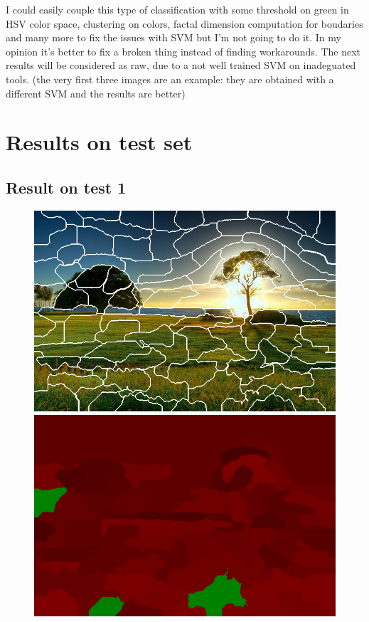 \documentclass[a4paper,titlepaget]{article}
\begin{document}
I could easily couple this type of classification with some threshold on green in HSV color space, clustering on colors, factal dimension computation for boudaries and many more to fix the issues with SVM but I'm not going to do it. In my opinion it's better to fix a broken thing instead of finding workarounds. The next results will be considered as raw, due to a not well trained SVM on inadeguated tools. (the very first three images are an example: they are obtained with a different SVM and the results are better)

\newpage
\section{Results on test set}
\subsection{Result on test 1}
\begin{figure}[htpb] 
	\centering
	\begin{minipage}{.3\textwidth}
		\includegraphics[width=1.7\textwidth]{images/results/1seg} 
	\end{minipage}
	\hspace{.25\textwidth}
	\begin{minipage}{.3\textwidth}
		\includegraphics[width=1.7\textwidth]{images/results/1map}
	\end{minipage}  
\end{figure}
\end{document}

